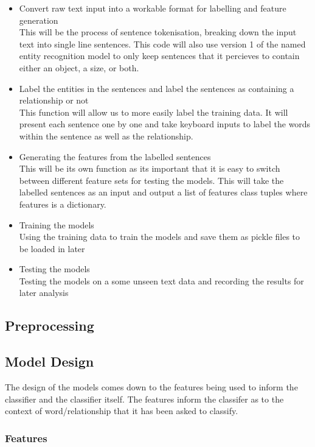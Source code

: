 \documentclass[11pt,oneside]{book}
\begin{document}
\begin{itemize}
\item Convert raw text input into a workable format for labelling and feature generation \\
This will be the process of sentence tokenisation, breaking down the input text into single line sentences. This code will also use version 1 of the named entity recognition model to only keep sentences that it percieves to contain either an object, a size, or both.
\item Label the entities in the sentences and label the sentences as containing a relationship or not \\
This function will allow us to more easily label the training data. It will present each sentence one by one and take keyboard inputs to label the words within the sentence as well as the relationship.
\item Generating the features from the labelled sentences \\
This will be its own function as its important that it is easy to switch between different feature sets for testing the models. This will take the labelled sentences as an input and output a list of features class tuples where features is a dictionary.
\item Training the models \\
Using the training data to train the models and save them as pickle files to be loaded in later
\item Testing the models \\
Testing the models on a some unseen text data and recording the results for later analysis
\end{itemize}

\subsection{Preprocessing}


\subsection{Model Design}
The design of the models comes down to the features being used to inform the classifier and the classifier itself. The features inform the classifer as to the context of word/relationship that it has been asked to classify.

\subsubsection{Features}
\end{document}
